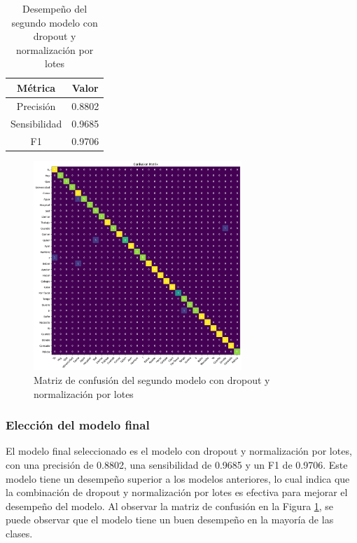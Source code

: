 \begin{table}[H]
    \centering
    \begin{tabular}{|c|c|}
        \hline
        \textbf{Métrica} & \textbf{Valor} \\
        \hline
        Precisión & 0.8802 \\
        \hline
        Sensibilidad & 0.9685 \\
        \hline
        F1 & 0.9706 \\
        \hline
    \end{tabular}
    \caption{Desempeño del segundo modelo con dropout y normalización por lotes}
    \label{tab:DesempeñoModeloDropoutBNV2}
\end{table}

\begin{figure}[H]
    \centering
    \includegraphics[width=0.7\textwidth]{figuras/modelDropoutBNV2CM.png}
    \caption{Matriz de confusión del segundo modelo con dropout y normalización por lotes}
    \label{fig:CMModeloDropoutBNV2}
\end{figure}

\subsubsection{Elección del modelo final}

El modelo final seleccionado es el modelo con dropout y normalización por lotes, con una precisión de 0.8802, una sensibilidad de 0.9685 y un F1 de 0.9706.
Este modelo tiene un desempeño superior a los modelos anteriores, lo cual indica que la combinación de dropout y normalización por lotes es efectiva para mejorar el desempeño del modelo.
Al observar la matriz de confusión en la Figura \ref{fig:CMModeloDropoutBNV2}, se puede observar que el modelo tiene un buen desempeño en la mayoría de las clases.

